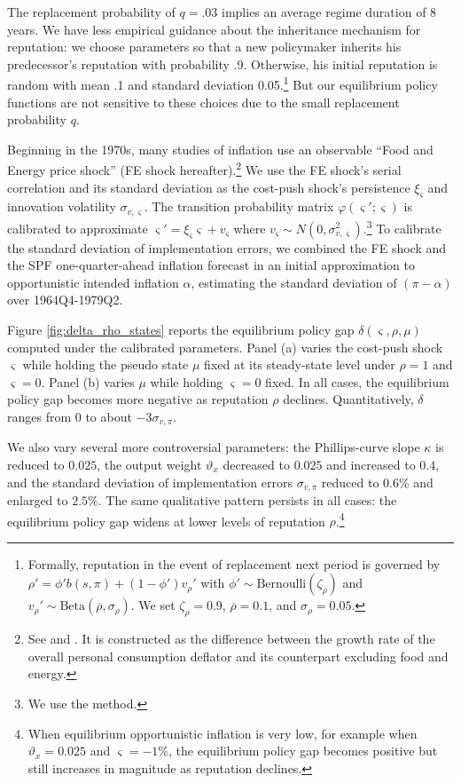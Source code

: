 \documentclass[12pt,letter,leqno]{article}
\theoremstyle{asn}
\theoremstyle{lem}
\theoremstyle{slem}
\theoremstyle{prop}
\theoremstyle{appprop}
\theoremstyle{rem}
\theoremstyle{defn}
\begin{document}
The replacement probability of $q=.03$ implies an average regime duration of 8 years. We have less empirical guidance about the inheritance mechanism for reputation: we choose parameters so that a new policymaker inherits his predecessor's reputation with probability .9. Otherwise, his initial reputation is random with mean .1 and standard deviation 0.05.\footnote{Formally, reputation in the event of replacement next period is governed by $\rho' =\phi'b(s,\pi) + (1-\phi')v_{\rho}'$ with $\phi' \sim \text{Bernoulli}(\zeta_\rho)$ and $v_{\rho}' \sim \text{Beta}(\overline{\rho},\sigma_{\rho})$. We set $\zeta_\rho=0.9$, $\overline{\rho}=0.1$, and $\sigma_{\rho}=0.05$.} But our equilibrium policy functions are not sensitive to these choices due to the small replacement probability $q$.



Beginning in the 1970s, many studies of inflation use an observable ``Food and Energy price shock'' (FE shock hereafter).\footnote{See  and \cite{watson_inflation_2014}. It is constructed as the difference between the growth rate of the overall personal consumption deflator and its counterpart excluding food and energy.} We use the FE shock's serial correlation and its standard deviation as the cost-push shock's persistence $\xi_\varsigma$ and innovation volatility $\sigma _{v,\varsigma}$. The transition probability matrix $\varphi(\varsigma';\varsigma)$ is calibrated to approximate  $\varsigma'=\xi_{\varsigma}\varsigma + v_{\varsigma}$ where $v_{\varsigma}\sim N(0,\sigma^2_{v,\varsigma})$.\footnote{We use the \cite{rouwenhorst_asset_1995} method.} To calibrate the standard deviation of implementation errors, we combined the FE shock and the SPF one-quarter-ahead inflation forecast in an initial approximation to opportunistic intended inflation $\alpha$, estimating the standard deviation of $(\pi-\alpha)$ over 1964Q4-1979Q2.

Figure \ref{fig:delta_rho_states} reports the equilibrium policy gap $\delta(\varsigma,\rho,\mu)$ computed under the calibrated parameters. Panel (a) varies the cost-push shock $\varsigma$ while holding the pseudo state $\mu$ fixed at its steady-state level under $\rho=1$ and $\varsigma=0$. Panel (b) varies $\mu$ while holding $\varsigma=0$ fixed. In all cases, the equilibrium policy gap becomes more negative as reputation $\rho$ declines. Quantitatively, $\delta$ ranges from 0 to about $-3\sigma_{v,\pi}$.

We also vary several more controversial parameters: the Phillips-curve slope $\kappa$ is reduced to $0.025$, the output weight $\vartheta_x$ decreased to $0.025$ and increased to $0.4$, and the standard deviation of implementation errors $\sigma_{v,\pi}$ reduced to $0.6\%$ and enlarged to $2.5\%$. The same qualitative pattern persists in all cases: the equilibrium policy gap widens at lower levels of reputation $\rho$.\footnote{When equilibrium opportunistic inflation is very low, for example when $\vartheta_x=0.025$ and $\varsigma=-1\%$, the equilibrium policy gap becomes positive but still increases in magnitude as reputation declines.}
\end{document}

